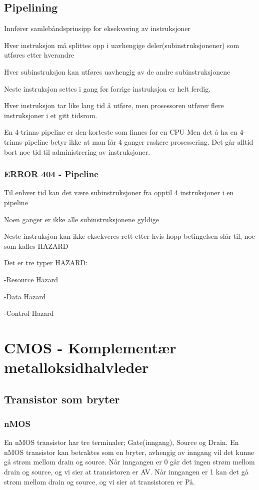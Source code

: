 \documentclass{article}
\begin{document}
	\subsection{Pipelining}
	
	Innfører samlebåndsprinsipp for eksekvering av instruksjoner
	
	Hver instruksjon må splittes opp i uavhengige deler(subinstruksjonener) som utføres etter hverandre
	
	Hver subinstruksjon kan utføres uavhengig av de andre subinstruksjonene 
	
	Neste instruksjon settes i gang før forrige instruksjon er helt ferdig.
	
	Hver instruksjon tar like lang tid å utføre, men prosessoren utfører flere instruksjoner i et gitt tidsrom. 
	
	En 4-trinns pipeline er den korteste som finnes for en CPU
	Men det å ha en 4-trinns pipeline betyr ikke at man får 4 ganger raskere prosessering. Det går alltid bort noe tid til administrering av instruksjoner.
	
	\subsubsection{ERROR 404 - Pipeline}
	
	Til enhver tid kan det være subinstruksjoner fra opptil 4 instruksjoner i en pipeline
	
	Noen ganger er ikke alle subinstruksjonene gyldige 
	
	Neste instruksjon kan ikke eksekveres rett etter hvis hopp-betingelsen slår til, noe som kalles HAZARD
	
	Det er tre typer HAZARD:
	
	-Resource Hazard
	
	-Data Hazard
	
	-Control Hazard
	
	
	\section{CMOS - Komplementær metalloksidhalvleder}
	
	\subsection{Transistor som bryter}
	\subsubsection{nMOS}
	En nMOS transistor har tre terminaler; Gate(inngang), Source og Drain. En nMOS transistor kan betraktes som en bryter, avhengig av inngang vil det kunne gå strøm mellom drain og source. Når inngangen er 0 går det ingen strøm mellom drain og source, og vi sier at transistoren er AV. Når inngangen er 1 kan det gå strøm mellom drain og source, og vi sier at transistoren er På.
	
\end{document}
